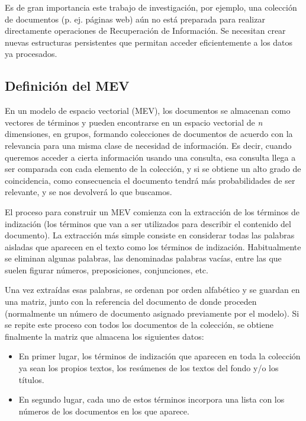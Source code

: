 \documentclass[titlepage]{article}
\begin{document}
	Es de gran importancia este trabajo de investigación, por ejemplo, una colección de documentos (p. ej. páginas web) aún no está preparada para realizar directamente operaciones de Recuperación de Información. Se necesitan crear nuevas estructuras persistentes que permitan acceder eficientemente a los datos ya procesados.
	
	\subsection{Definición del MEV}
	
	En un modelo de espacio vectorial (MEV), los documentos se almacenan como vectores de términos y pueden encontrarse en un espacio vectorial de \textit{n} dimensiones, en grupos, formando colecciones de documentos de acuerdo con la relevancia para una misma clase de necesidad de información. Es decir, cuando queremos acceder a cierta información usando una consulta, esa consulta llega a ser comparada con cada elemento de la colección, y si se obtiene un alto grado de coincidencia, como consecuencia el documento tendrá más probabilidades de ser relevante, y se nos devolverá lo que buscamos.
	
	El proceso para construir un MEV comienza con la extracción de los términos de indización (los términos que van a ser utilizados para describir el contenido del documento). La extracción más simple consiste en considerar todas las palabras aisladas que aparecen en el texto como los términos de indización. Habitualmente se eliminan algunas palabras, las denominadas palabras vacías, entre las que suelen figurar números, preposiciones, conjunciones, etc.
	
	Una vez extraídas esas palabras, se ordenan por orden alfabético y se guardan en una matriz, junto con la referencia del documento de donde proceden (normalmente un número de documento asignado previamente por el modelo). Si se repite este proceso con todos los documentos de la colección, se obtiene finalmente la matriz que almacena los siguientes datos:
	
	\begin{itemize}
		\item En primer lugar, los términos de indización que aparecen en toda la colección ya sean los propios textos, los resúmenes de los textos del fondo y/o los títulos.
		\item En segundo lugar, cada uno de estos términos incorpora una lista con los números de los documentos en los que aparece.
	\end{itemize}
	
\end{document}
